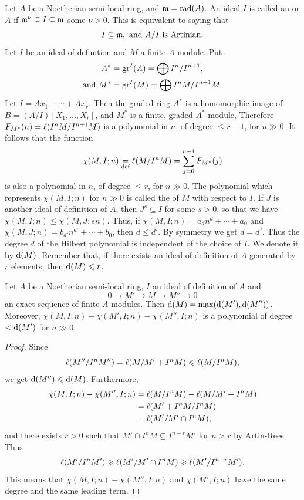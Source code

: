 \documentclass[../main]{subfiles}
\begin{document}
\newparagraph Let $A$ be a Noetherian semi-local ring, and $\mathfrak{m}=\operatorname{rad}(A)$. An ideal $I$ is called an  or $A$ if $\mathfrak{m}^\nu \subseteq I \subseteq \mathfrak{m}$ some $\nu>0$. This is equivalent to saying that \[I \subseteq \mathfrak{m}, \text{ and }A / I\text{ is Artinian}.\] Let $I$ be an ideal of definition and $M$ a finite $A$-module. Put \begin{align*}
    A^*&=\operatorname{gr}^I(A)=\bigoplus I^n / I^{n+1},\\
    \text{and }M^*&=\operatorname{gr}^I(M)=\bigoplus I^n M/I^{n+1} M.
\end{align*}
Let $I=Ax_1+\cdots+Ax_r$. Then the graded ring $A^*$ is a homomorphic image of $B=(A / I)[X_1, \ldots, X_r]$, and $M^*$ is a finite, graded $A^*$-module, Therefore $F_{M^*}(n)=\ell(I^n M / I^{n+1} M)$ is a polynomial in $n$, of degree $\leqslant r-1$, for $n\gg 0$. It follows that the function \[\chi(M, I;n)\underset{\text{def}}{=}\ell(M / I^n M)=\sum_{j=0}^{n-1} F_{M^*}(j)\] is also a polynomial in $n$, of degree $\leqslant r$, for $n \gg 0$. The polynomial which represents $\chi(M, I ; n)$ for $n \gg 0$ is called the  of $M$ with respect to $I$. If $J$ is another ideal of definition of $A$, then $J^s \subseteq I$ for some $s>0$, so that we have $\chi(M, I ; n) \leqslant \chi(M, J ; s n)$. Thus, if $\chi(M, I ; n)=a_dn^d+\cdots+a_0$ and $\chi(M, J ; n)=b_{d'}n^{d'}+\cdots+b_0$, then $d\leqslant d'$. By symmetry we get $d=d'$. Thus the degree $d$ of the Hilbert polynomial is independent of the choice of $I$. We denote it by $\mathrm{d}(M)$.\label{sym:hilbertd} Remember that, if there exists an ideal of definition of $A$ generated by $r$ elements, then $\mathrm{d}(M) \leqslant r$.

\begin{parproposition}
Let $A$ be a Noetherian semi-local ring, $I$ an ideal of definition of $A$ and \[0 \longrightarrow M' \longrightarrow M \longrightarrow M'' \longrightarrow 0\] an exact sequence of finite $A$-modules. Then $\mathrm{d}(M)=\max(\mathrm{d}(M'), \mathrm{d}(M''))$. Moreover, $\chi(M, I ; n)-\chi(M', I ; n)-\chi(M'', I ; n)$ is a polynomial of degree $<\mathrm{d}(M')$ for $n \gg 0$.
\end{parproposition}

\begin{proof}
Since \[\ell(M'' / I^n M'')=\ell(M / M'+I^n M) \leqslant \ell(M / I^n M),\] we get \newline $\mathrm{d}(M'') \leqslant \mathrm{d}(M)$. Furthermore, \[\begin{aligned}\chi(M, I ; n)-\chi(M'', I ; n)&=\ell(M / I^nM)-\ell(M / M'+I^n M)\\&=\ell(M'+I^n M / I^n M)\\&=\ell(M' / M' \cap I^n M),\end{aligned}\] and there exists $r>0$ such that $M' \cap I^n M \subseteq I^{n-r} M'$ for $n>r$ by Artin-Rees. Thus \[\ell(M' / I^n M') \geqslant \ell(M' / M' \cap I^n M) \geqslant \ell(M' / I^{n-r} M').\] This means that $\chi(M, I ; n)-\chi(M'', I ; n)$ and $\chi(M', I ; n)$ have the same degree and the same leading term.
\end{proof}
\end{document}
